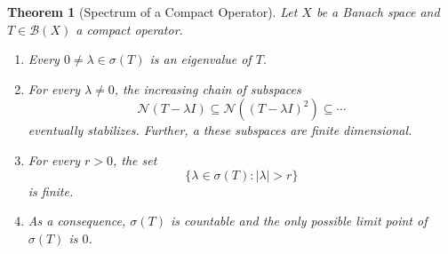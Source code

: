 \documentclass[12pt]{article}
\theoremstyle{thmstyle}
\newtheorem{theorem}{Theorem}[section]
\theoremstyle{defstyle}
\newcommand{\scrB}{\mathscr B}
\newcommand{\scrN}{\mathscr N}
\begin{document}
\begin{theorem}[Spectrum of a Compact Operator]
    Let $X$ be a Banach space and $T\in\scrB(X)$ a compact operator. 
    \begin{enumerate}[label=(\alph*)]
        \item Every $0\ne\lambda\in\sigma(T)$ is an eigenvalue of $T$. 
        \item For every $\lambda\ne 0$, the increasing chain of subspaces 
        \begin{equation*}
            \scrN(T - \lambda I)\subseteq\scrN((T - \lambda I)^2)\subseteq\cdots
        \end{equation*}
        eventually stabilizes. Further, a these subspaces are finite dimensional.
        \item For every $r > 0$, the set 
        \begin{equation*}
            \{\lambda\in\sigma(T)\colon |\lambda| > r\}
        \end{equation*}
        is finite.
        \item As a consequence, $\sigma(T)$ is countable and the only possible limit point of $\sigma(T)$ is $0$.
    \end{enumerate}
\end{theorem}
\end{document}
